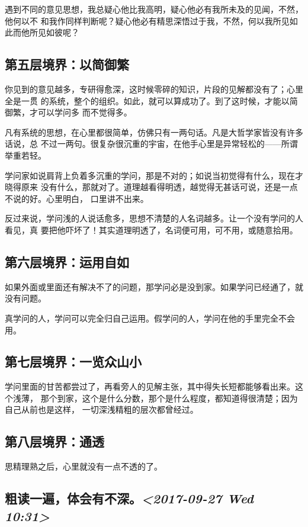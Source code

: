 \documentclass[11pt]{ctexart}
\begin{document}
{{{{遇到不同的意见思想，我总疑心他比我高明，疑心他必有我所未及的见闻，不然，他何以不
和我作同样判断呢？疑心他必有精思深悟过于我，不然，何以我所见如此而他所见如彼呢？

\subsection{第五层境界：以简御繁}
\label{sec:orge5a244f}
你见到的意见越多，专研得愈深，这时候零碎的知识，片段的见解都没有了；心里全是一贯
的系统，整个的组织。如此，就可以算成功了。到了这时候，才能以简御繁，才可以学问多
而不觉得多。

凡有系统的思想，在心里都很简单，仿佛只有一两句话。凡是大哲学家皆没有许多话说，总
不过一两句。很复杂很沉重的宇宙，在他手心里是异常轻松的——所谓举重若轻。

学问家如说肩背上负着多沉重的学问，那是不对的；如说当初觉得有什么，现在才晓得原来
没有什么，那就对了。道理越看得明透，越觉得无甚话可说，还是一点不说的好。心里明白，
口里讲不出来。

反过来说，学问浅的人说话愈多，思想不清楚的人名词越多。让一个没有学问的人看见，真
要把他吓坏了！其实道理明透了，名词便可用，可不用，或随意拾用。

\subsection{第六层境界：运用自如}
\label{sec:org34d9fce}

如果外面或里面还有解决不了的问题，那学问必是没到家。如果学问已经通了，就没有问题。

真学问的人，学问可以完全归自己运用。假学问的人，学问在他的手里完全不会用。

\subsection{第七层境界：一览众山小}
\label{sec:orgea183fa}
学问里面的甘苦都尝过了，再看旁人的见解主张，其中得失长短都能够看出来。这个浅薄，
那个到家，这个是什么分数，那个是什么程度，都知道得很清楚；因为自己从前也是这样，
一切深浅精粗的层次都曾经过。

\subsection{第八层境界：通透}
\label{sec:org91ffee4}

思精理熟之后，心里就没有一点不透的了。

\subsection{粗读一遍，体会有不深。\textit{<2017-09-27 Wed 10:31>}}
\label{sec:org052b700}

}}}}
\end{document}

